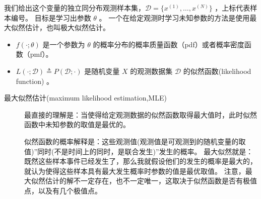 \documentclass[letterpaper,10pt,english]{sphinxmanual}
\begin{document}
我们给出这个变量的独立同分布观测样本集，\(\mathcal{D}=\{x^{(1)}, \ldots, x^{(N)}\}\) ，上标代表样本编号。
目标是学习出参数 \(\theta\) 。
一个在给定观测时学习未知参数的方法是使用最大似然估计，也叫极大似然估计。
\begin{itemize}
\item {} 
\(f(\cdot;\theta)\) 是一个参数为 \(\theta\) 的概率分布的概率质量函数（pdf）或者概率密度函数（pmf）。

\item {} 
\(L(\cdot ; \mathcal{D}) \triangleq P(\mathcal{D} ; \cdot)\) 是随机变量 \(X\) 的观测数据集 \(\mathcal{D}\) 的似然函数(likelihood function) 。

\end{itemize}
\begin{description}
\item[{最大似然估计(maximum likelihood estimation,MLE)\label{\detokenize{_u6700_u5927_u4f3c_u7136_u4f30_u8ba1/content:term-maximum-likelihood-estimation-MLE}}}] \leavevmode
最直接的理解是：当使得给定观测数据的似然函数取得最大值时，此时似然函数中未知参数的取值是最优的。

似然函数的概率解释是：这些观测值(观测值是可观测到的随机变量的取值)”同时(不是时间上的同时，是联合发生)”发生的概率。
最大似然就是：既然这些样本事件已经发生了，那么我就假设他们的发生的概率是最大的，就认为使得这些样本具有最大发生概率时参数的值是最优取值。
注意，最大似然估计的解不一定存在，也不一定唯一，这取决于似然函数是否有极值点，以及有几个极值点。

\end{description}
\end{document}
